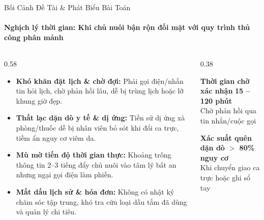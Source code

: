 \begin{frame}{Bối Cảnh Đề Tài \& Phát Biểu Bài Toán}
  \framesubtitle{\color{PetcareSecondary}\textbf{Nghịch lý thời gian: Khi chủ nuôi bận rộn đối mặt với quy trình thủ công phân mảnh}}

  \begin{columns}[T]
    \begin{column}{0.58\textwidth}
      \begin{itemize}
        \setlength\itemsep{0.4mm}
        \footnotesize
        \item \textbf{Khó khăn đặt lịch \& chờ đợi:} Phải gọi điện/nhắn tin hỏi lịch, chờ phản hồi lâu, dễ bị trùng lịch hoặc lỡ khung giờ đẹp.
        \item \textbf{Thất lạc dặn dò y tế \& dị ứng:} Tiền sử dị ứng xà phòng/thuốc dễ bị nhân viên bỏ sót khi đổi ca trực, tiềm ẩn nguy cơ viêm da.
        \item \textbf{Mù mờ tiến độ thời gian thực:} Khoảng trống thông tin 2--3 tiếng đẩy chủ nuôi vào tâm lý bất an nhưng ngại gọi điện làm phiền.
        \item \textbf{Mất dấu lịch sử \& hóa đơn:} Không có nhật ký chăm sóc tập trung, khó tra cứu loại dầu tắm đã dùng và quản lý chi tiêu.
      \end{itemize}
    \end{column}

    \begin{column}{0.38\textwidth}
      \begin{alertblock}{\centering \scriptsize \textbf{Thời gian chờ xác nhận}}
        \centering \vspace{0.2mm}
        {\large \textbf{15 -- 120 phút}}\\[0.2mm]
        {\tiny \color{PetcareDark}Chờ phản hồi qua tin nhắn/cuộc gọi}
      \end{alertblock}

      \vspace{-1.5mm}
      \begin{alertblock}{\centering \scriptsize \textbf{Xác suất quên dặn dò}}
        \centering \vspace{0.2mm}
        {\large \textbf{$>$ 80\% nguy cơ}}\\[0.2mm]
        {\tiny \color{PetcareDark}Khi chuyển giao ca trực hoặc ghi sổ tay}
      \end{alertblock}


\end{column}
\end{columns}
\end{frame}
